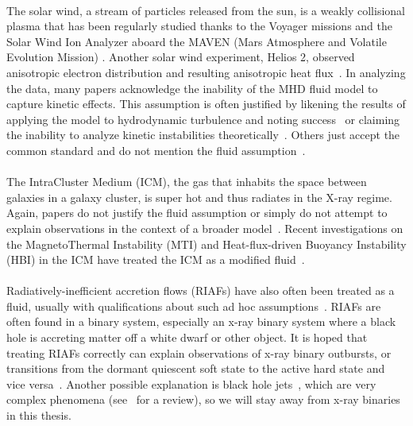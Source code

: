 \\
The solar wind, a stream of particles released from the sun, is a weakly collisional plasma that has been regularly studied thanks to the Voyager missions and the Solar Wind Ion Analyzer aboard the MAVEN (Mars Atmosphere and Volatile Evolution Mission) \cite{NASA2017}. Another solar wind experiment, Helios 2, observed anisotropic electron distribution and resulting anisotropic heat flux~\cite{Pilipp1987}. In analyzing the data, many papers acknowledge the inability of the MHD fluid model to capture kinetic effects. This assumption is often justified by likening the results of applying the model to hydrodynamic turbulence and noting success~\cite{Mattheus1982,Goldstein1995} or claiming the inability to analyze kinetic instabilities theoretically~\cite{Schwartz1980,Pudovkin1985}. Others just accept the common standard and do not mention the fluid assumption~\cite{Gosling1996}. \\
\\
The IntraCluster Medium (ICM), the gas that inhabits the space between galaxies in a galaxy cluster, is super hot and thus radiates in the X-ray regime. Again, papers do not justify the fluid assumption or simply do not attempt to explain observations in the context of a broader model~\cite{Fabian1994,Carilli2002,Mendygral2012}. Recent investigations on the MagnetoThermal Instability (MTI) and Heat-flux-driven Buoyancy Instability (HBI) in the ICM have treated the ICM as a modified fluid~\cite{Chandran2006,Parrish2008a,Parrish2008b,Parrish2007,Parrish2005}.\\
\\
Radiatively-inefficient accretion flows (RIAFs) have also often been treated as a fluid, usually with qualifications about such ad hoc assumptions~\cite{Dexter2013,Hawley2001,Stone1996,Jiang2013,Jiang2014,Stone1994,Turner2002,Sano2004}. RIAFs are often found in a binary system, especially an x-ray binary system where a black hole is accreting matter off a white dwarf or other object. It is hoped that treating RIAFs correctly can explain observations of x-ray binary outbursts, or transitions from the dormant quiescent soft state to the active hard state and vice versa~\cite{McClintock2006,Das2013,Das2013b,Niedzwiecki2014,Sadowski2016}. Another possible explanation is black hole jets~\cite{Veledina2013,Fender2009,Nixon2014}, which are very complex phenomena (see~\cite{Hawley2015} for a review), so we will stay away from x-ray binaries in this thesis.\\
\\
